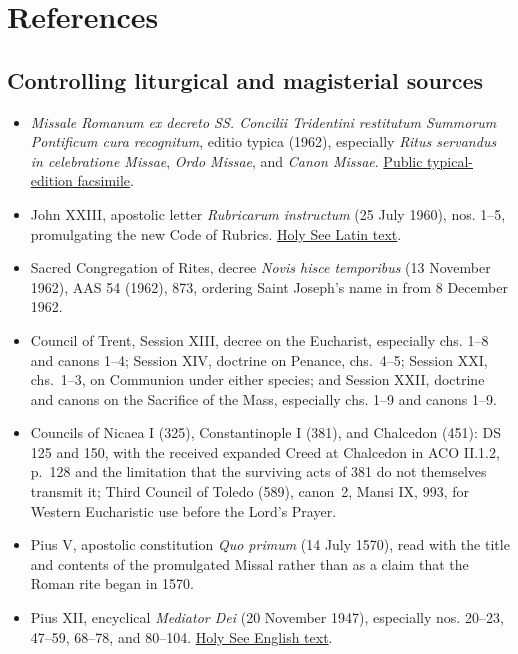 \section{References}

\begingroup\footnotesize

\subsection{Controlling liturgical and magisterial sources}

\begin{itemize}
  \item \emph{Missale Romanum ex decreto SS. Concilii Tridentini restitutum Summorum Pontificum cura recognitum}, editio typica (1962), especially \emph{Ritus servandus in celebratione Missae}, \emph{Ordo Missae}, and \emph{Canon Missae}. \href{https://media.churchmusicassociation.org/pdf/missale62.pdf}{Public typical-edition facsimile}.
  \item John XXIII, apostolic letter \emph{Rubricarum instructum} (25 July 1960), nos. 1--5, promulgating the new Code of Rubrics. \href{https://www.vatican.va/content/john-xxiii/la/motu_proprio/documents/hf_j-xxiii_motu-proprio_19600725_rubricarum-instructum.html}{Holy See Latin text}.
  \item Sacred Congregation of Rites, decree \emph{Novis hisce temporibus} (13 November 1962), AAS 54 (1962), 873, ordering Saint Joseph's name in  from 8 December 1962.
  \item Council of Trent, Session XIII, decree on the Eucharist, especially chs. 1--8 and canons 1--4; Session XIV, doctrine on Penance, chs.~4--5; Session XXI, chs.~1--3, on Communion under either species; and Session XXII, doctrine and canons on the Sacrifice of the Mass, especially chs. 1--9 and canons 1--9.
  \item Councils of Nicaea I (325), Constantinople I (381), and Chalcedon (451): DS 125 and 150, with the received expanded Creed at Chalcedon in ACO II.1.2, p.~128 and the limitation that the surviving acts of 381 do not themselves transmit it; Third Council of Toledo (589), canon~2, Mansi IX, 993, for Western Eucharistic use before the Lord's Prayer.
  \item Pius V, apostolic constitution \emph{Quo primum} (14 July 1570), read with the title and contents of the promulgated Missal rather than as a claim that the Roman rite began in 1570.
  \item Pius XII, encyclical \emph{Mediator Dei} (20 November 1947), especially nos. 20--23, 47--59, 68--78, and 80--104. \href{https://www.vatican.va/content/pius-xii/en/encyclicals/documents/hf_p-xii_enc_20111947_mediator-dei.html}{Holy See English text}.

\end{itemize}
